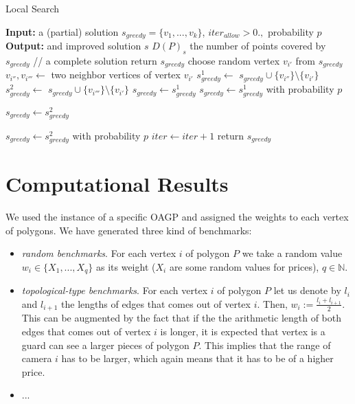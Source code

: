 \documentclass[runningheads,a4paper]{llncs}
\begin{document}
       \begin{algorithm}[!t]
      	\caption{Local Search}\label{alg:local-search}
      	\begin{algorithmic}[1]
      		\State \textbf{Input:} a (partial) solution $s_{greedy}=\{v_1,...,v_k\}$, $iter_{allow}>0., $ probability $p$ 
      		\State \textbf{Output:} and improved solution $s$
      		     \State $D(P)_s$ the number of points covered by $s_{greedy}$
      		       // a complete solution
      		          \State return $s_{greedy}$
      		      \EndIf
      		     \State choose random vertex $v_{i'}$ from $s_{greedy}$
      		     \State $v_{i''},v_{i'''} \gets$ two neighbor vertices of vertex  $v_{i'}$
      		     \State $s^1_{greedy} \gets$ $s_{greedy} \cup \{v_{i''} \} \setminus \{v_{i'}\}$
                 \State $s^2_{greedy} \gets$ $s_{greedy} \cup \{v_{i'''} \} \setminus \{v_{i'}\}$
                        \State $s_{greedy} \gets s^1_{greedy}$
      \EndIf
                        \State $s_{greedy} \gets s^1_{greedy}$ with probability $p$
                    
      		      \EndIf     
                        \State $s_{greedy} \gets s^2_{greedy}$
      		      \EndIf
                    
                        \State $s_{greedy} \gets s^2_{greedy}$ with probability $p$
                    \EndIf
      		     \State $iter \gets iter +1 $
      		\EndWhile
      		 \State return $s_{greedy}$
      	\end{algorithmic}
      \end{algorithm}

     \section{Computational Results}
       We used the instance of a specific OAGP and assigned the weights to each vertex of polygons. We have generated three kind of benchmarks:
       \begin{itemize}
       	  \item \emph{random benchmarks}. For each vertex $i$ of polygon $P$ we take a random value $w_i \in \{X_1,...,X_q\}$  as its weight ($X_i$ are some random values for prices), $q \in \mathbb{N}$.
       	  \item \emph{topological-type benchmarks}. For each vertex $i$ of polygon $P$ let us denote by $l_i$ and $l_{i+1}$ the lengths of edges that comes out of vertex $i$. Then, $w_i := \frac{l_i + l_{i+1}}{2}$. This can be augmented by the fact that if the the arithmetic length of both edges that comes out of vertex $i$ is longer, it is expected that vertex is a guard can see a larger pieces of polygon $P$. This implies that the range of camera $i$ has to be larger, which again means that it has to be of a higher price.
       	  \item    ...
       \end{itemize}
\end{document}
